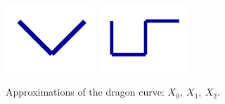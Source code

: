 \documentclass[a4paper, fleqn, 10pt]{report}
\theoremstyle{definition}
\begin{document}
\begin{enumerate}[a)]
\begin{figure}[ht!]
  \includegraphics[width=0.3\textwidth]{dragon2}
  \includegraphics[width=0.3\textwidth]{dragon3}
  \caption{Approximations of the dragon curve: $X_0,\ X_1,\ X_2$.}\label{fig:dragon}
\end{figure}
\end{enumerate}
\end{document}
